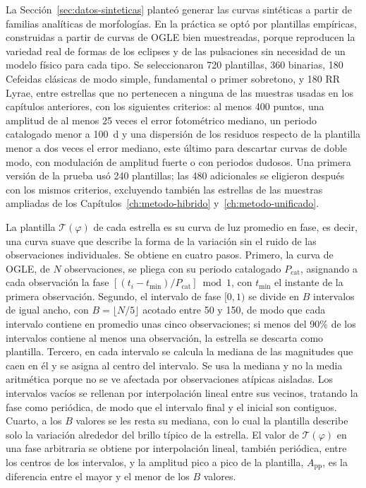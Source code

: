 \documentclass[12pt,letterpaper,oneside]{book}
\begin{document}
La Secci\'on~\ref{sec:datos-sinteticas} plante\'o generar las curvas sint\'eticas a partir de familias anal\'iticas de morfolog\'ias. En la pr\'actica se opt\'o por plantillas emp\'iricas, construidas a partir de curvas de OGLE bien muestreadas, porque reproducen la variedad real de formas de los eclipses y de las pulsaciones sin necesidad de un modelo f\'isico para cada tipo. Se seleccionaron 720 plantillas, 360 binarias, 180 Cefeidas cl\'asicas de modo simple, fundamental o primer sobretono, y 180 RR Lyrae, entre estrellas que no pertenecen a ninguna de las muestras usadas en los cap\'itulos anteriores, con los siguientes criterios: al menos 400 puntos, una amplitud de al menos 25 veces el error fotom\'etrico mediano, un periodo catalogado menor a 100~d y una dispersi\'on de los residuos respecto de la plantilla menor a dos veces el error mediano, este \'ultimo para descartar curvas de doble modo, con modulaci\'on de amplitud fuerte o con periodos dudosos. Una primera versi\'on de la prueba us\'o 240 plantillas; las 480 adicionales se eligieron despu\'es con los mismos criterios, excluyendo tambi\'en las estrellas de las muestras ampliadas de los Cap\'itulos~\ref{ch:metodo-hibrido} y~\ref{ch:metodo-unificado}.

La plantilla $\mathcal{T}(\varphi)$ de cada estrella es su curva de luz promedio en fase, es decir, una curva suave que describe la forma de la variaci\'on sin el ruido de las observaciones individuales. Se obtiene en cuatro pasos. Primero, la curva de OGLE, de $N$ observaciones, se pliega con su periodo catalogado $P_{\mathrm{cat}}$, asignando a cada observaci\'on la fase $[(t_i-t_{\mathrm{min}})/P_{\mathrm{cat}}] \bmod 1$, con $t_{\mathrm{min}}$ el instante de la primera observaci\'on. Segundo, el intervalo de fase $[0,1)$ se divide en $B$ intervalos de igual ancho, con $B=\lfloor N/5\rfloor$ acotado entre 50 y 150, de modo que cada intervalo contiene en promedio unas cinco observaciones; si menos del 90\% de los intervalos contiene al menos una observaci\'on, la estrella se descarta como plantilla. Tercero, en cada intervalo se calcula la mediana de las magnitudes que caen en \'el y se asigna al centro del intervalo. Se usa la mediana y no la media aritm\'etica porque no se ve afectada por observaciones at\'ipicas aisladas. Los intervalos vac\'ios se rellenan por interpolaci\'on lineal entre sus vecinos, tratando la fase como peri\'odica, de modo que el intervalo final y el inicial son contiguos. Cuarto, a los $B$ valores se les resta su mediana, con lo cual la plantilla describe solo la variaci\'on alrededor del brillo t\'ipico de la estrella. El valor de $\mathcal{T}(\varphi)$ en una fase arbitraria se obtiene por interpolaci\'on lineal, tambi\'en peri\'odica, entre los centros de los intervalos, y la amplitud pico a pico de la plantilla, $A_{\mathrm{pp}}$, es la diferencia entre el mayor y el menor de los $B$ valores.
\end{document}
